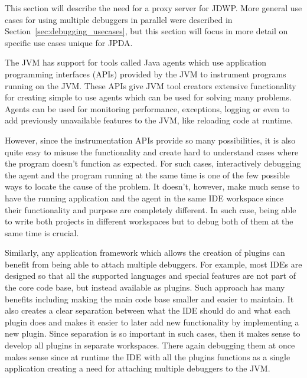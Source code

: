 \documentclass[..thesis.tex]{subfiles}
\begin{document}
This section will describe the need for a proxy server for JDWP.
More general use cases for using multiple debuggers in parallel were described in Section~\ref{sec:debugging_usecases}, 
but this section will focus in more detail on specific use cases unique for JPDA.

The JVM has support for tools called Java agents which use application programming interfaces (APIs) provided by the JVM to instrument programs running on the JVM.
These APIs give JVM tool creators extensive functionality for creating simple to use agents which can be used for solving many problems.
Agents can be used for monitoring performance, exceptions, logging or even to add previously unavailable features to the JVM, like reloading code at runtime.

However, since the instrumentation APIs provide so many possibilities, it is also quite easy to misuse the functionality and create hard to understand cases where the program doesn't function as expected.
For such cases, interactively debugging the agent and the program running at the same time is one of the few possible ways to locate the cause of the problem.
It doesn't, however, make much sense to have the running application and the agent in the same IDE workspace since their functionality and purpose are completely different.
In such case, being able to write both projects in different workspaces but to debug both of them at the same time is crucial.

Similarly, any application framework which allows the creation of plugins can benefit from being able to attach multiple debuggers.
For example, most IDEs are designed so that all the supported languages and special features are not part of the core code base, but instead available as plugins. 
Such approach has many benefits including making the main code base smaller and easier to maintain.
It also creates a clear separation between what the IDE should do and what each plugin does and makes it easier to later add new functionality by implementing a new plugin.
Since separation is so important in such cases, then it makes sense to develop all plugins in separate workspaces.
There again debugging them at once makes sense since at runtime the IDE with all the plugins functions as a single application creating a need for attaching multiple debuggers to the JVM.
\end{document}
